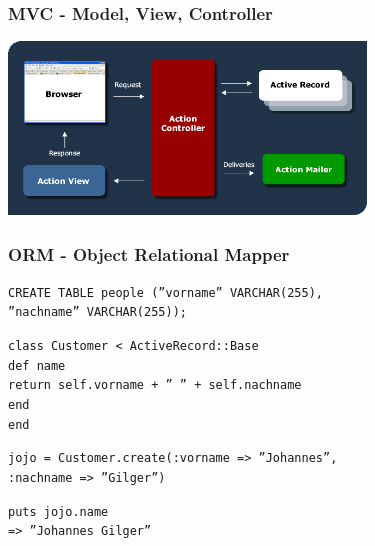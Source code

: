 \begin{frame}
  \frametitle{MVC - Model, View, Controller}
  \begin{center}
    \includegraphics[width=9.5cm]{img/mvc_rails.png}
  \end{center}
\end{frame}

\begin{frame}
  \frametitle{ORM - Object Relational Mapper}
  {\tt \small CREATE TABLE people (''vorname'' VARCHAR(255),} \\
  {\tt \small \enskip ''nachname'' VARCHAR(255));} \\
  \vspace{0.3cm}
  \pause

  {\tt \small class Customer < ActiveRecord::Base} \\
  {\tt \small \enskip def name} \\
  {\tt \small \enskip \enskip return self.vorname + '' '' + self.nachname} \\
  {\tt \small \enskip end} \\
  {\tt \small end} \\
  \vspace{0.3cm}
  \pause

  {\tt \small jojo = Customer.create(:vorname => ''Johannes'',} \\
  {\tt \small \enskip :nachname => ''Gilger'')} \\
  \vspace{0.3cm}
  \pause

  {\tt \small puts jojo.name} \\
  {\tt \small {\color{green}=> ''Johannes Gilger''}}
\end{frame}


